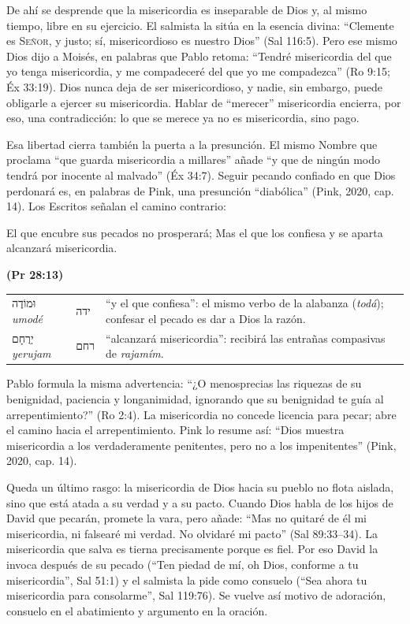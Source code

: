 \documentclass[11pt,letterpaper]{article}
\newcommand{\heb}[1]{\mbox{\foreignlanguage{hebrew}{#1}}}
\newcommand{\SENOR}{\textsc{Señor}}
\newcommand{\fuente}[1]{\par\hfill{\upshape\bfseries\small\textcolor{azul}{#1}}}
\begin{document}
De ahí se desprende que la misericordia es inseparable de Dios y, al mismo tiempo, libre en su ejercicio. El salmista la sitúa en la esencia divina: ``Clemente es \SENOR, y justo; sí, misericordioso es nuestro Dios'' (Sal 116:5). Pero ese mismo Dios dijo a Moisés, en palabras que Pablo retoma: ``Tendré misericordia del que yo tenga misericordia, y me compadeceré del que yo me compadezca'' (Ro 9:15; Éx 33:19). Dios nunca deja de ser misericordioso, y nadie, sin embargo, puede obligarle a ejercer su misericordia. Hablar de ``merecer'' misericordia encierra, por eso, una contradicción: lo que se merece ya no es misericordia, sino pago.

Esa libertad cierra también la puerta a la presunción. El mismo Nombre que proclama ``que guarda misericordia a millares'' añade ``y que de ningún modo tendrá por inocente al malvado'' (Éx 34:7). Seguir pecando confiado en que Dios perdonará es, en palabras de Pink, una presunción ``diabólica'' (Pink, 2020, cap. 14). Los Escritos señalan el camino contrario:

\begin{cita}El que encubre sus pecados no prosperará; Mas el que los confiesa y se aparta alcanzará misericordia.\fuente{(Pr 28:13)}\end{cita}

\begin{filologia}[Pr 28:13]
\begin{tabular}{@{}L{3.2cm}L{1.6cm}L{10cm}@{}}
\heb{וּמוֹדֶה} \emph{umodé} & \heb{ידה} & ``y el que confiesa'': el mismo verbo de la alabanza (\emph{todá}); confesar el pecado es dar a Dios la razón. \\[2pt]
\heb{יְרֻחָם} \emph{yerujam} & \heb{רחם} & ``alcanzará misericordia'': recibirá las entrañas compasivas de \emph{rajamím}. \\
\end{tabular}
\end{filologia}

Pablo formula la misma advertencia: ``¿O menosprecias las riquezas de su benignidad, paciencia y longanimidad, ignorando que su benignidad te guía al arrepentimiento?'' (Ro 2:4). La misericordia no concede licencia para pecar; abre el camino hacia el arrepentimiento. Pink lo resume así: ``Dios muestra misericordia a los verdaderamente penitentes, pero no a los impenitentes'' (Pink, 2020, cap. 14).

Queda un último rasgo: la misericordia de Dios hacia su pueblo no flota aislada, sino que está atada a su verdad y a su pacto. Cuando Dios habla de los hijos de David que pecarán, promete la vara, pero añade: ``Mas no quitaré de él mi misericordia, ni falsearé mi verdad. No olvidaré mi pacto'' (Sal 89:33--34). La misericordia que salva es tierna precisamente porque es fiel. Por eso David la invoca después de su pecado (``Ten piedad de mí, oh Dios, conforme a tu misericordia'', Sal 51:1) y el salmista la pide como consuelo (``Sea ahora tu misericordia para consolarme'', Sal 119:76). Se vuelve así motivo de adoración, consuelo en el abatimiento y argumento en la oración.
\end{document}
